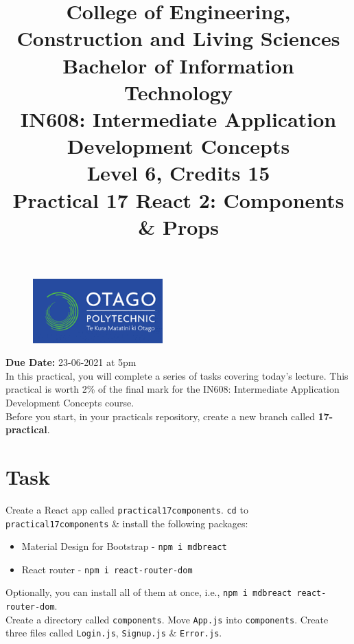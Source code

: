 \documentclass{article}
\author{}
\begin{document}
\begin{figure}
	\centering
	\includegraphics[width=50mm]{./img/logo.png}
\end{figure}

\title{College of Engineering, Construction and Living Sciences\\Bachelor of Information Technology\\IN608: Intermediate Application Development Concepts\\Level 6, Credits 15\\\textbf{Practical 17 React 2: Components \& Props}} 
\date{}
\maketitle

\textbf{Due Date:} 23-06-2021 at 5pm \\

In this practical, you will complete a series of tasks covering today's lecture. This practical is worth 2\% of the final mark for the IN608: Intermediate Application Development Concepts course. \\

Before you start, in your practicals repository, create a new branch called \textbf{17-practical}.

\section*{Task} 
Create a React app called \texttt{practical17components}. \texttt{cd} to \texttt{practical17components} \& install the following packages:
\begin{itemize}
  \item Material Design for Bootstrap - \texttt{npm i mdbreact}
  \item React router - \texttt{npm i react-router-dom}
\end{itemize}

Optionally, you can install all of them at once, i.e., \texttt{npm i mdbreact react-router-dom}. \\

Create a directory called \texttt{components}. Move \texttt{App.js} into \texttt{components}. Create three files called \texttt{Login.js}, \texttt{Signup.js} \& \texttt{Error.js}. \\
\end{document}
